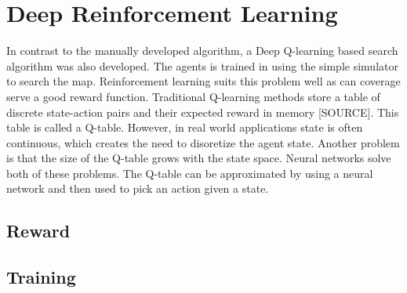 \section{Deep Reinforcement Learning}
In contrast to the manually developed algorithm, a Deep Q-learning based search algorithm was also developed. The agents is trained in using the simple simulator to search the map. Reinforcement learning suits this problem well as can coverage serve a {\color{red} good} reward function. Traditional Q-learning methods store a table of discrete state-action pairs and their expected reward in memory {\color{red}[SOURCE]}. This table is called a Q-table. However, in real world applications state is often continuous, which creates the need to {\color{red} disoretize} the agent state. Another problem is that the size of the Q-table grows with the state space. Neural networks solve both of these problems. The Q-table can be approximated by using a neural network and then used to pick an action given a state.

\subsection{Reward}

\subsection{Training}
